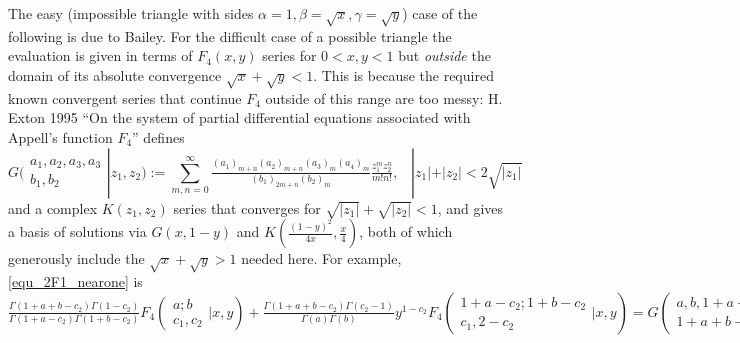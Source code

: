 \documentclass[12pt]{article}
\numberwithin{equation}{section}
\newcommand{\ArgS}[3] {( \begin{smallmatrix} #1 \\ #2 \end{smallmatrix} | {#3})}
\newcommand{\appellFfourS}[6]    {F_4 \ArgS{{#1};{#2}}{{#3},{#4}}{{#5},{#6}}}
\begin{document}
The easy (impossible triangle with sides $\alpha=1,\beta=\sqrt{x},\gamma=\sqrt{y}$) case of the following is due to Bailey. For the difficult case of a possible triangle the evaluation is given in terms of $F_4(x,y)$ series for $0<x,y<1$ but \emph{outside} the domain of its absolute convergence $\sqrt{x} + \sqrt{y} < 1$. This is because the required known convergent series that continue $F_4$ outside of this range are too messy: H. Exton 1995 ``On the system of partial differential equations associated with Appell's function $F_4$'' defines
\begin{equation*}
G \ArgS{a_1,a_2,a_3,a_3}{b_1,b_2}{z_1,z_2} := \sum_{m,n=0}^{\infty} \tfrac{(a_1)_{m+n} (a_2)_{m+n} (a_3)_m (a_4)_m }{(b_1)_{2m+n} (b_2)_{m}} \tfrac{z_1^m z_2^n}{m! n!} \text{,} \quad |z_1| + |z_2| < 2 \sqrt{|z_1|}
\end{equation*}
and a complex $K(z_1,z_2)$ series that converges for $\sqrt{|z_1|} + \sqrt{|z_2|} < 1$, and gives a basis of solutions via $G(x,1-y)$ and $K(\frac{(1-y)^2}{4x},\frac{x}{4})$, both of which generously include the $\sqrt{x} + \sqrt{y} > 1$ needed here. For example, \eqref{equ_2F1_nearone} is
\begin{equation*}
\tfrac{\Gamma(1+a+b-c_2)\Gamma(1-c_2)}{\Gamma(1+a-c_2)\Gamma(1+b-c_2)} \appellFfourS{a}{b}{c_1}{c_2}{x}{y} + \tfrac{\Gamma(1+a+b-c_2)\Gamma(c_2-1)}{\Gamma(a)\Gamma(b)} y^{1-c_2}\appellFfourS{1+a-c_2}{1+b-c_2}{c_1}{2-c_2}{x}{y}  = G \ArgS{a,b,1+a-c_2,1+b-c_2}{1+a+b-c_2,c_1}{x,1-y}\text{.}
\end{equation*}
\end{document}
